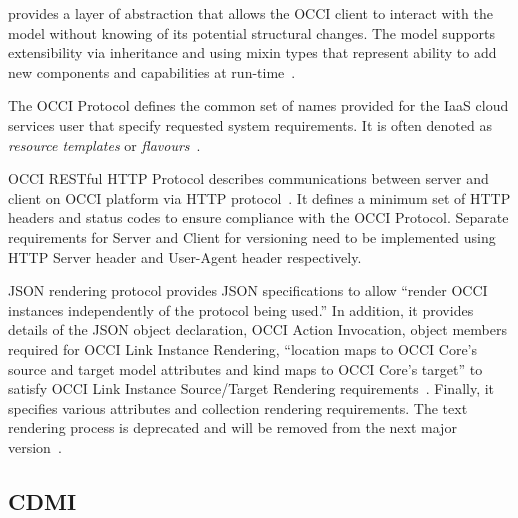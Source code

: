 {     provides a layer of abstraction that allows the OCCI client to
     interact with the model without knowing of its potential
     structural changes. The model supports extensibility via
     inheritance and using mixin types that represent ability to add
     new components and capabilities at
     run-time~\cite{nyren-edmonds-papaspyrou-2016}.

     The OCCI Protocol defines the common set of names provided for
     the IaaS cloud services user that specify requested system
     requirements. It is often denoted as \textit{resource templates}
     or \textit{flavours}~\cite{drescher-parak-wallom-2015}.

     OCCI RESTful HTTP Protocol describes communications between
     server and client on OCCI platform via HTTP
     protocol~\cite{nyren-edmonds-metsch-2016}. It defines a minimum
     set of HTTP headers and status codes to ensure compliance with
     the OCCI Protocol. Separate requirements for Server and Client
     for versioning need to be implemented using HTTP Server header
     and User-Agent header respectively.

     JSON rendering protocol provides JSON specifications to allow
     ``render OCCI instances independently of the protocol being
     used.'' In addition, it provides details of the JSON object
     declaration, OCCI Action Invocation, object members required for
     OCCI Link Instance Rendering, ``location maps to OCCI Core's
     source and target model attributes and kind maps to OCCI Core's
     target'' to satisfy OCCI Link Instance Source/Target Rendering
     requirements~\cite{nyren-feldhaus-parak-2016}.  Finally, it
     specifies various attributes and collection rendering
     requirements.  The text rendering process is deprecated and will
     be removed from the next major
     version~\cite{edmonds-metsch-2016}.

     \pv
	 
\subsection{CDMI}

}

